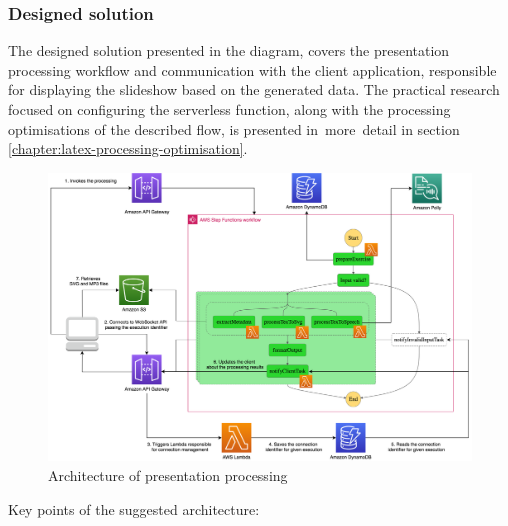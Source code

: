 \subsubsection{Designed solution}

The designed solution presented in the diagram, covers the presentation processing workflow and communication with the client application, responsible for displaying the slideshow based on the generated data.
The practical research focused on configuring the serverless function, along with the processing optimisations of the described flow, is presented in~more~detail in section \ref{chapter:latex-processing-optimisation}. 

\begin{figure}[H]
   \centering
   \includegraphics[width=1\textwidth]{assets/04-serverless-for-web-apps/euclidArchitecture.png}
   \caption{Architecture of presentation processing}
   \label{fig:euclid-web-app}
\end{figure} 

\newpage

Key points of the suggested architecture:

